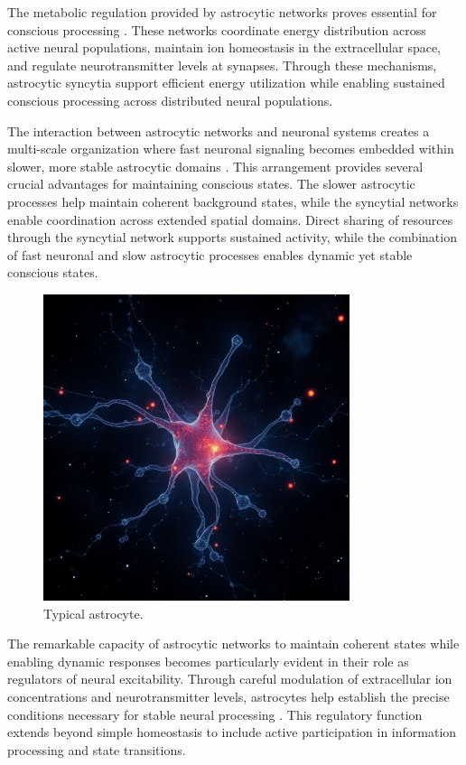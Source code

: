 \begin{refsection}
The metabolic regulation provided by astrocytic networks proves essential for conscious processing \cite{Verkhratsky2018}. These networks coordinate energy distribution across active neural populations, maintain ion homeostasis in the extracellular space, and regulate neurotransmitter levels at synapses. Through these mechanisms, astrocytic syncytia support efficient energy utilization while enabling sustained conscious processing across distributed neural populations.

The interaction between astrocytic networks and neuronal systems creates a multi-scale organization where fast neuronal signaling becomes embedded within slower, more stable astrocytic domains \cite{Halassa2010}. This arrangement provides several crucial advantages for maintaining conscious states. The slower astrocytic processes help maintain coherent background states, while the syncytial networks enable coordination across extended spatial domains. Direct sharing of resources through the syncytial network supports sustained activity, while the combination of fast neuronal and slow astrocytic processes enables dynamic yet stable conscious states.

\begin{figure}[h]
    \centering
    \includegraphics[width=0.8\textwidth]{images/astrocyte.png}

    \caption{Typical astrocyte.}
\end{figure}

The remarkable capacity of astrocytic networks to maintain coherent states while enabling dynamic responses becomes particularly evident in their role as regulators of neural excitability. Through careful modulation of extracellular ion concentrations and neurotransmitter levels, astrocytes help establish the precise conditions necessary for stable neural processing \cite{Araque2014}. This regulatory function extends beyond simple homeostasis to include active participation in information processing and state transitions.


\end{refsection}
